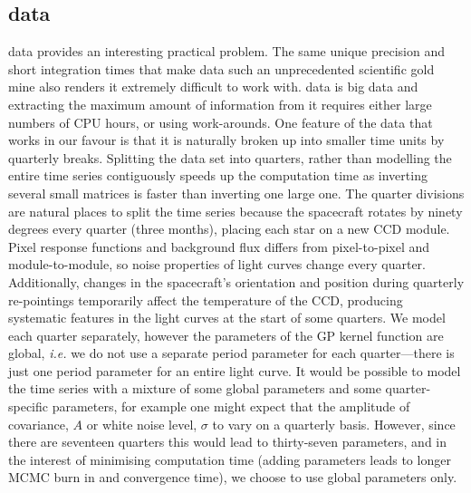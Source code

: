 \subsection{\kepler data}
\kepler data provides an interesting practical problem.
The same unique precision and short integration times that make \kepler
data such an unprecedented scientific gold mine also renders it extremely
difficult to work with.
\kepler data is big data and extracting the maximum amount of information
from it requires either large numbers of CPU hours, or using work-arounds.
One feature of the \kepler data that works in our favour is that it is
naturally broken up into smaller time units by quarterly breaks.
Splitting the data set into quarters, rather than modelling the entire time
series contiguously speeds up the computation time as inverting several
small matrices is faster than inverting one large one.
The \kepler quarter divisions are natural places to split the time series
because the spacecraft rotates by ninety degrees every quarter (three months),
placing each star on a new CCD module.
Pixel response functions and background flux differs from pixel-to-pixel and
module-to-module, so noise properties of \kepler light curves change every
quarter.
Additionally, changes in the spacecraft's orientation and position during
quarterly re-pointings temporarily affect the temperature of the CCD,
producing systematic features in the light curves at the start of some
quarters.
We model each quarter separately, however the parameters of the GP kernel
function are global, {\it i.e.} we do not use a separate period parameter for
each quarter---there is just one period parameter for an entire light curve.
It would be possible to model the time series with a mixture of some global
parameters and some quarter-specific parameters, for example one might expect
that the amplitude of covariance, $A$ or white noise level, $\sigma$ to vary
on a quarterly basis.
However, since there are seventeen quarters this would lead to thirty-seven
parameters, and in the interest of minimising computation time (adding
parameters leads to longer MCMC burn in and convergence time), we choose to
use global parameters only.
